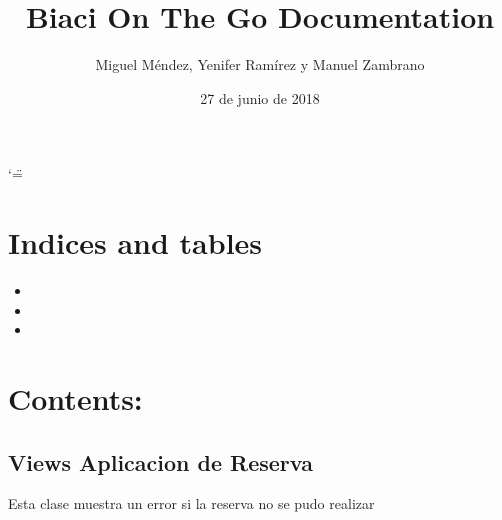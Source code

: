 \documentclass[letterpaper,10pt,spanish]{sphinxmanual}
\title{Biaci On The Go Documentation}
\date{27 de junio de 2018}
\author{Miguel Méndez, Yenifer Ramírez y Manuel Zambrano}
\begin{document}
\ifnum\catcode`\"=\active{}\fi
\maketitle
\sphinxtableofcontents
{}\label{\detokenize{index::doc}}



\chapter{Indices and tables}
\label{\detokenize{index:indices-and-tables}}\begin{itemize}
\item {} 

\item {} 

\item {} 

\end{itemize}


\chapter{Contents:}
\label{\detokenize{index:contents}}

\section{Views Aplicacion de Reserva}
\label{\detokenize{modules/reserva/views:module-reserva.views}}\label{\detokenize{modules/reserva/views:views-aplicacion-de-reserva}}\label{\detokenize{modules/reserva/views::doc}}

\begin{fulllineitems}
\label{\detokenize{modules/reserva/views:reserva.views.ErrorReserva}}
Esta clase muestra un error si la reserva no se pudo realizar

\end{fulllineitems}

\end{document}
